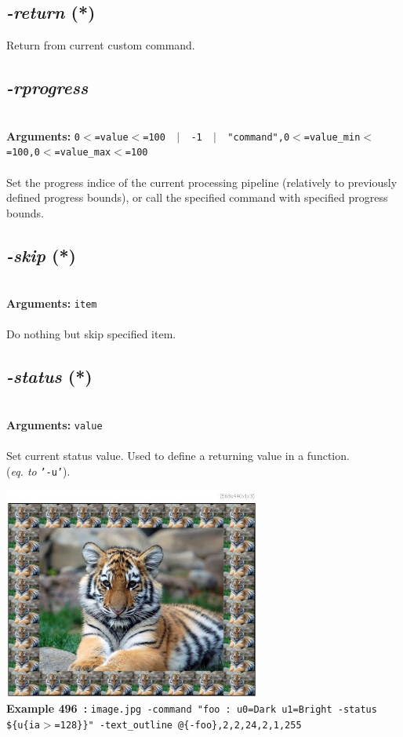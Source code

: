 \documentclass[a4paper,11pt,twoside]{book}
\begin{document}
\subsection{\emph{-return} (*)}\vspace*{-0.5em}
Return from current custom command.


\subsection{\emph{-rprogress} }\vspace*{-0.5em}
~\\\textbf{Arguments: } 
{\small \texttt{0$<$=value$<$=100 ~$|$~ -1 ~$|$~ "command",0$<$=value\_min$<$=100,0$<$=value\_max$<$=100}}\\~\\
Set the progress indice of the current processing pipeline (relatively to
previously defined progress bounds), or call the specified command with
specified progress bounds.


\subsection{\emph{-skip} (*)}\vspace*{-0.5em}
~\\\textbf{Arguments: } 
{\small \texttt{item}}\\~\\
Do nothing but skip specified item.


\subsection{\emph{-status} (*)}\vspace*{-0.5em}
~\\\textbf{Arguments: } 
{\small \texttt{value}}\\~\\
Set current status value. Used to define a returning value in a function.
~\\(\emph{eq. to} {\small \texttt{'-u'}}).
\begin{center}\includegraphics[keepaspectratio=true,height=7cm,width=\textwidth]{img/gmic_def496.jpg}\\
{\footnotesize \textbf{Example 496~:} \texttt{image.jpg -command "foo : u0=Dark u1=Bright -status \$\{u\{ia$>$=128\}\}" -text\_outline @\{-foo\},2,2,24,2,1,255}}
\end{center}
\end{document}
